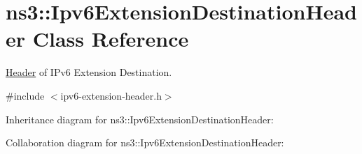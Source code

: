 \hypertarget{classns3_1_1Ipv6ExtensionDestinationHeader}{}\section{ns3\+:\+:Ipv6\+Extension\+Destination\+Header Class Reference}
\label{classns3_1_1Ipv6ExtensionDestinationHeader}


\hyperlink{classns3_1_1Header}{Header} of I\+Pv6 Extension Destination.  




{\ttfamily \#include $<$ipv6-\/extension-\/header.\+h$>$}



Inheritance diagram for ns3\+:\+:Ipv6\+Extension\+Destination\+Header\+:


Collaboration diagram for ns3\+:\+:Ipv6\+Extension\+Destination\+Header\+:

